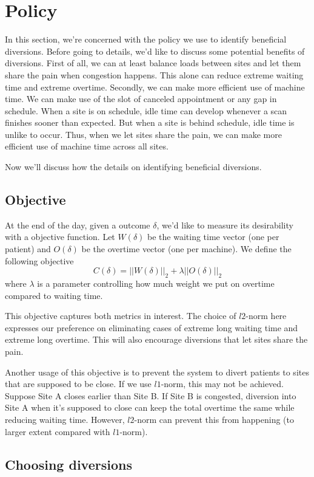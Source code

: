 \section{Policy}

In this section, we're concerned with the policy we use to identify
beneficial diversions. Before going to details, we'd like to discuss
some potential benefits of diversions. First of all, we can at least
balance loads between sites and let them share the pain when congestion
happens. This alone can reduce extreme waiting time and extreme overtime.
Secondly, we can make more efficient use of machine time. We can make
use of the slot of canceled appointment or any gap in schedule.
When a site is on schedule, idle time can develop whenever a scan finishes
sooner than expected. But when a site is behind schedule, idle time is
unlike to occur. Thus, when we let sites share the pain, we can make
more efficient use of machine time across all sites.

Now we'll discuss how the details on identifying beneficial diversions.

\subsection{Objective}

At the end of the day, given a outcome $\delta$, we'd like to measure
its desirability with a objective function. Let $W(\delta)$ be the
waiting time vector (one per patient) and $O(\delta)$ be the overtime
vector (one per machine). We define the following objective
\[  C(\delta) = ||W(\delta)||_2 + \lambda ||O(\delta)||_2 \]
where $\lambda$ is a parameter controlling how much weight
we put on overtime compared to waiting time.

This objective captures both metrics in interest. The choice of
$l2$-norm here expresses our preference on eliminating cases of
extreme long waiting time and extreme long overtime. This will
also encourage diversions that let sites share the pain.

Another usage of this objective is to prevent the system to
divert patients to sites that are supposed to be close.
If we use $l1$-norm, this may not be achieved. Suppose Site A
closes earlier than Site B. If Site B is congested, diversion
into Site A when it's supposed to close can keep the total
overtime the same while reducing waiting time. However,
$l2$-norm can prevent this from happening (to larger extent
compared with $l1$-norm).

\subsection{Choosing diversions}

